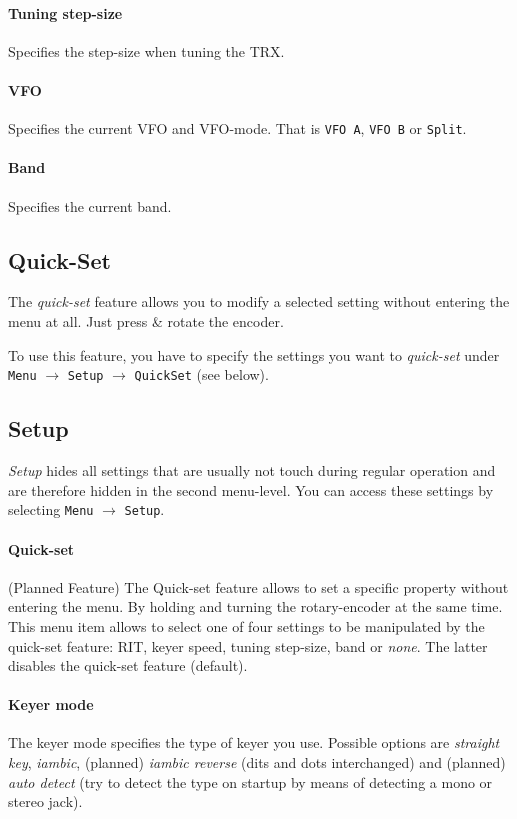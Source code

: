 \documentclass[10pt, a4paper,twoside,openright]{scrartcl}
\begin{document}
\paragraph{Tuning step-size}
Specifies the step-size when tuning the TRX.

\paragraph{VFO}
Specifies the current VFO and VFO-mode. That is \texttt{VFO A}, \texttt{VFO B} or \texttt{Split}.

\paragraph{Band}
Specifies the current band. 


\subsection{Quick-Set}
The \emph{quick-set} feature allows you to modify a selected setting without entering the menu at all. Just press \& rotate the  encoder.

To use this feature, you have to specify the settings you want to \emph{quick-set} under \texttt{Menu} $\rightarrow$ \texttt{Setup} $\rightarrow$ \texttt{QuickSet} (see below).

\subsection{Setup}
\emph{Setup} hides all settings that are usually not touch during regular operation and are therefore hidden in the second menu-level. You can access these settings by selecting \texttt{Menu} $\rightarrow$ \texttt{Setup}.

\paragraph{Quick-set}
(Planned Feature) The Quick-set feature allows to set a specific property without entering the menu. By holding and turning the rotary-encoder at the same time. This menu item allows to select one of four settings to be manipulated by the quick-set feature: RIT, keyer speed, tuning step-size, band or \emph{none}. The latter disables the quick-set feature (default).

\paragraph{Keyer mode}
The keyer mode specifies the type of keyer you use. Possible options are \emph{straight key}, \emph{iambic}, (planned) \emph{iambic reverse} (dits and dots interchanged) and (planned) \emph{auto detect} (try to detect the type on startup by means of detecting a mono or stereo jack). 
\end{document}
